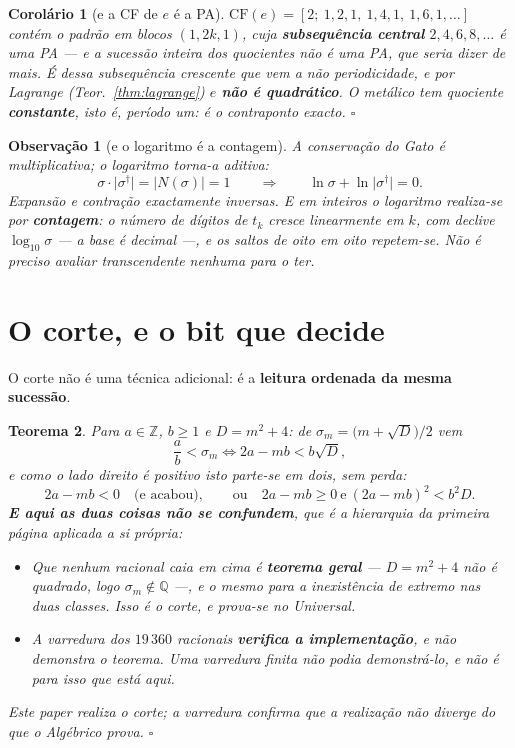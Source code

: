 \documentclass[11pt,a4paper]{article}
\newtheorem{teorema}{Teorema}
\newtheorem{corolario}[teorema]{Corolário}
\newtheorem{observacao}{Observação}
\newcommand{\abs}[1]{\lvert #1\rvert}
\newcommand{\dg}{^{\dagger}}
\begin{document}
\begin{corolario}[e a CF de $e$ é a PA]\label{cor:e-pa}
$\mathrm{CF}(e)=[2;\ 1,2,1,\ 1,4,1,\ 1,6,1,\ldots]$ contém o padrão em blocos
$(1,2k,1)$, cuja \textbf{subsequência central} $2,4,6,8,\ldots$ é uma PA --- e a
sucessão \emph{inteira} dos quocientes não é uma PA, que seria dizer de mais. É
dessa subsequência crescente que vem a não periodicidade, e por Lagrange
(Teor.~\ref{thm:lagrange}) $e$ \textbf{não é quadrático}. O metálico tem quociente
\textbf{constante}, isto é, período um: é o contraponto exacto. $\square$
\end{corolario}

\begin{observacao}[e o logaritmo é a contagem]\label{obs:ln}
A conservação do Gato é multiplicativa; o logaritmo torna-a aditiva:
\[
\sigma\cdot\abs{\sigma\dg}=\abs{N(\sigma)}=1
\qquad\Longrightarrow\qquad
\ln\sigma+\ln\abs{\sigma\dg}=0 .
\]
Expansão e contração exactamente inversas. E em inteiros o logaritmo realiza-se por
\textbf{contagem}: o número de dígitos de $t_k$ cresce linearmente em $k$, com
declive $\log_{10}\sigma$ --- a base é decimal ---, e os saltos de oito em oito
repetem-se. Não é preciso avaliar
transcendente nenhuma para o ter.
\end{observacao}

\section{O corte, e o bit que decide}\label{sec:corte}

O corte não é uma técnica adicional: é a \textbf{leitura ordenada da mesma
sucessão}.

\begin{teorema}\label{thm:corte}
Para $a\in\mathbb{Z}$, $b\geq1$ e $D=m^{2}+4$: de
$\sigma_m=\bigl(m+\sqrt{D}\bigr)/2$ vem
\[
\frac ab<\sigma_m
\iff 2a-mb<b\sqrt{D} ,
\]
e como o lado direito é positivo isto parte-se em dois, sem perda:
\[
2a-mb<0\quad\text{(e acabou)},\qquad\text{ou}\quad
2a-mb\geq0\ \text{e}\ (2a-mb)^{2}<b^{2}D .
\]
\textbf{E aqui as duas coisas não se confundem}, que é a hierarquia da primeira
página aplicada a si própria:
\begin{itemize}
\item \emph{Que} nenhum racional caia em cima é \textbf{teorema geral} ---
$D=m^{2}+4$ não é quadrado, logo $\sigma_m\notin\mathbb{Q}$ ---, e o mesmo
para a inexistência de extremo nas duas classes. Isso é o corte, e prova-se no
Universal.
\item A varredura dos $19\,360$ racionais \textbf{verifica a implementação}, e
não demonstra o teorema. Uma varredura finita não podia demonstrá-lo, e não é
para isso que está aqui.
\end{itemize}
Este paper \emph{realiza} o corte; a varredura confirma que a realização não
diverge do que o Algébrico prova. $\square$
\end{teorema}
\end{document}
